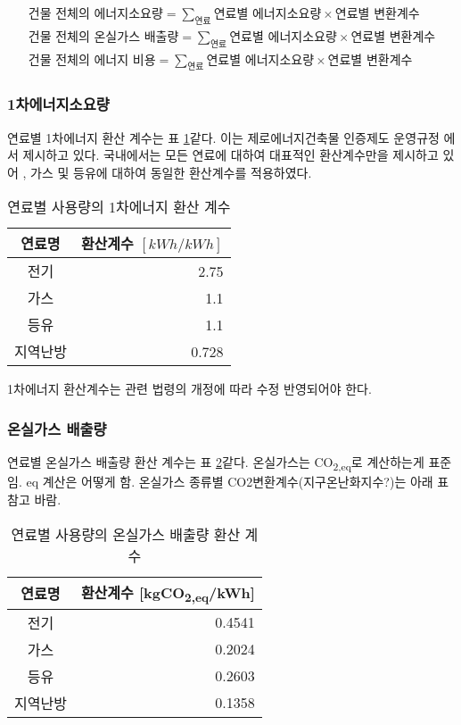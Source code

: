 \begin{align}
  \text{건물 전체의 에너지소요량} = \sum_{\text{연료}} \text{연료별 에너지소요량} \times \text{연료별 변환계수} \label{eq:1st_energy_calculation}\\
  \text{건물 전체의 온실가스 배출량} = \sum_{\text{연료}} \text{연료별 에너지소요량} \times \text{연료별 변환계수} \label{eq:co2_calculation}\\ 
  \text{건물 전체의 에너지 비용} = \sum_{\text{연료}} \text{연료별 에너지소요량} \times \text{연료별 변환계수} \label{eq:cost_calculation}
\end{align}

\subsubsection{1차에너지소요량}
연료별 1차에너지 환산 계수는 표 \ref{tbl:coeff_kWh_to_1stkWh}\와 같다. 이는 제로에너지건축물 인증제도 운영규정 \cite{law:energy_to_1stenergy} 에서 제시하고 있다. 국내에서는 모든 연료에 대하여 대표적인 환산계수만을 제시하고 있어 \cite{Jeong2021energydeungkeup}, 가스 및 등유에 대하여 동일한 환산계수를 적용하였다.

\begin{table}[ht]
  \caption{연료별 사용량의 1차에너지 환산 계수}
  \label{tbl:coeff_kWh_to_1stkWh}  
  \centering
  \begin{tabular}{cr}
    \toprule
    연료명 & \makecell{환산계수 \\ $[kWh/kWh]$} \\ \midrule
    전기 & 2.75 \\
    가스 & 1.1 \\
    등유 & 1.1 \\
    지역난방 & 0.728 \\ \bottomrule
  \end{tabular}
\end{table}

1차에너지 환산계수는 관련 법령의 개정에 따라 수정 반영되어야 한다.

\subsubsection{온실가스 배출량}
연료별 온실가스 배출량 환산 계수는 표 \ref{tbl:coeff_kWh_to_CO2}\와 같다. 온실가스는 CO\textsubscript{2,eq}로 계산하는게 표준임. eq 계산은 어떻게 함. 온실가스 종류별 CO2변환계수(지구온난화지수?)는 아래 표 참고 바람.

\begin{table}[ht]
  \caption{연료별 사용량의 온실가스 배출량 환산 계수}
  \label{tbl:coeff_kWh_to_CO2}  
  \centering
  \begin{tabular}{cr}
    \toprule
    연료명 & 환산계수 [kgCO\textsubscript{2,eq}/kWh] \\ \midrule
    전기 & 0.4541 \\
    가스 & 0.2024 \\
    등유 & 0.2603 \\
    지역난방 & 0.1358 \\ \bottomrule
  \end{tabular}
\end{table}

